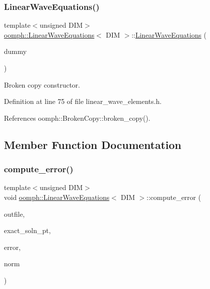 \subsubsection{\texorpdfstring{Linear\+Wave\+Equations()}{LinearWaveEquations()}\hspace{0.1cm}{\footnotesize\ttfamily [2/2]}}
{\footnotesize\ttfamily template$<$unsigned D\+IM$>$ \\
\hyperlink{classoomph_1_1LinearWaveEquations}{oomph\+::\+Linear\+Wave\+Equations}$<$ D\+IM $>$\+::\hyperlink{classoomph_1_1LinearWaveEquations}{Linear\+Wave\+Equations} (\begin{DoxyParamCaption}\item[{const \hyperlink{classoomph_1_1LinearWaveEquations}{Linear\+Wave\+Equations}$<$ D\+IM $>$ \&}]{dummy }\end{DoxyParamCaption})\hspace{0.3cm}{\ttfamily [inline]}}



Broken copy constructor. 



Definition at line 75 of file linear\+\_\+wave\+\_\+elements.\+h.



References oomph\+::\+Broken\+Copy\+::broken\+\_\+copy().



\subsection{Member Function Documentation}
\mbox{\label{classoomph_1_1LinearWaveEquations_acf05d02ed25f46d2b0b8310fb8bc448b}} 
\subsubsection{\texorpdfstring{compute\+\_\+error()}{compute\_error()}\hspace{0.1cm}{\footnotesize\ttfamily [1/2]}}
{\footnotesize\ttfamily template$<$unsigned D\+IM$>$ \\
void \hyperlink{classoomph_1_1LinearWaveEquations}{oomph\+::\+Linear\+Wave\+Equations}$<$ D\+IM $>$\+::compute\+\_\+error (\begin{DoxyParamCaption}\item[{std\+::ostream \&}]{outfile,  }\item[{\hyperlink{classoomph_1_1FiniteElement_a690fd33af26cc3e84f39bba6d5a85202}{Finite\+Element\+::\+Steady\+Exact\+Solution\+Fct\+Pt}}]{exact\+\_\+soln\+\_\+pt,  }\item[{double \&}]{error,  }\item[{double \&}]{norm }\end{DoxyParamCaption})\hspace{0.3cm}{\ttfamily [virtual]}}




